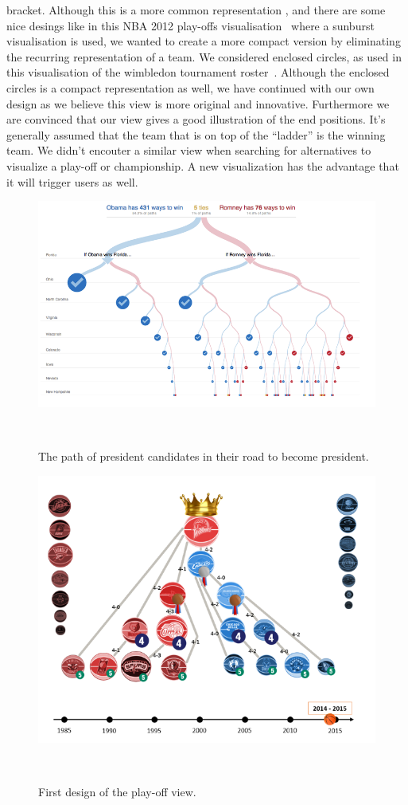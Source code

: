\documentclass{sigchi}
\begin{document}
bracket.  Although this is a more common representation , and there are some
nice desings like in this NBA 2012 play-offs
visualisation~\cite{tournamentladder} where a sunburst visualisation is used,
we wanted to create a more compact version by eliminating the recurring
representation of a team. We considered enclosed circles, as used in this
visualisation of the wimbledon tournament roster~\cite{enclosedcircles}.
Although the enclosed circles is a compact representation as well, we have
continued with our own design as we believe this view is more original and
innovative. Furthermore we are convinced that our view gives a good
illustration of the end positions. It's generally assumed that the team that is
on top of the ``ladder'' is the winning team. We didn't encouter a similar view
when searching for alternatives to visualize a play-off or championship. A new
visualization has the advantage that it will trigger users as well.


\begin{figure}
\centering
  \includegraphics[width=0.9\columnwidth]{figures/presidentcandidatesvisualization}
  \caption{The path of president candidates in their road to become president.}~\label{fig:whitehousepath}
\end{figure}

\begin{figure}
\centering
  \includegraphics[width=0.9\columnwidth]{figures/playoffviewfirstdesign}
  \caption{First design of the play-off view.}~\label{fig:firstdesignplayoffview}
\end{figure}
\end{document}
